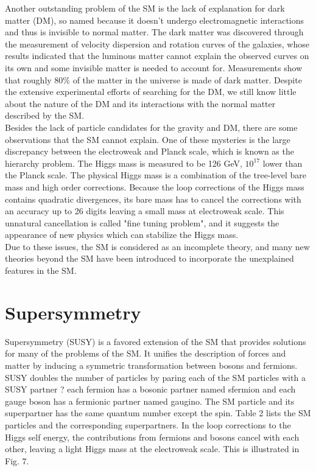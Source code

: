 \documentclass[thesis.tex]{subfiles}
\begin{document}
Another outstanding problem of the SM is the lack of explanation for dark matter (DM), so named because it doesn't undergo electromagnetic interactions and thus is invisible to normal matter. The dark matter was discovered through the measurement of velocity dispersion and rotation curves of the galaxies, whose results indicated that the luminous matter cannot explain the observed curves on its own and some invisible matter is needed to account for. Measurements show that roughly 80\% of the matter in the universe is made of dark matter. Despite the extensive experimental efforts of searching for the DM, we still know little about the nature of the DM and its interactions with the normal matter described by the SM. \\

Besides the lack of particle candidates for the gravity and DM, there are some observations that the SM  cannot explain. One of these mysteries is the large discrepancy between the electroweak and Planck scale, which is known as the hierarchy problem. The Higgs mass is measured to be 126 GeV, $10^{17}$ lower than the Planck scale. The physical Higgs mass is a combination of the tree-level bare mass and high order corrections. Because the loop corrections of the Higgs mass contains quadratic divergences, its bare mass has to cancel the corrections with an accuracy up to 26 digits leaving a small mass at electroweak scale. This unnatural cancellation is called "fine tuning problem", and it suggests the appearance of new physics which can stabilize the Higgs mass. \\

Due to these issues, the SM is considered as an incomplete theory, and many new theories beyond the SM have been introduced to incorporate the unexplained features in the SM. 


\section{Supersymmetry}

Supersymmetry (SUSY) is a favored extension of the SM that provides solutions for many of the problems of the SM. 
It unifies the description of forces and matter by inducing a symmetric transformation between bosons and fermions. 
SUSY doubles the number of particles by paring each of the SM particles with a SUSY partner ? each fermion has a bosonic partner named sfermion and each gauge boson has a fermionic partner named gaugino. 
The SM particle and its superpartner has the same quantum number except the spin. 
Table 2 lists the SM particles and the corresponding superpartners. 
In the loop corrections to the Higgs self energy, the contributions from fermions and bosons cancel with each other, leaving a light Higgs mass at the electroweak scale. This is illustrated in Fig. 7. \\
\end{document}
